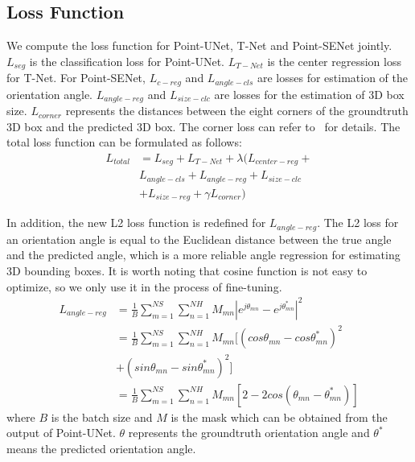 \documentclass[letterpaper]{article}
\begin{document}
\subsection{Loss Function}
We compute the loss function for Point-UNet, T-Net and Point-SENet jointly.
$L_{seg}$ is the classification loss for Point-UNet. $L_{T-Net}$ is
the center regression loss for T-Net. For Point-SENet, $L_{c-reg}$ and $L_{angle-cls}$ are losses for estimation of the orientation angle. $L_{angle-reg}$ and $L_{size-clc}$ are losses for the estimation of 3D box size. $L_{corner}$ represents the distances between the eight corners of the groundtruth 3D box and the predicted 3D box. The corner loss can refer to~\cite{qi2017frustum} for details. The total loss function can be formulated as follows:
\begin{equation}
\begin{aligned}
 L_{total} & =  L_{seg} + L_{T-Net} + \lambda (L_{center-reg}+ \\
 & L_{angle-cls}+ L_{angle-reg}+L_{size-clc} \\
  & +L_{size-reg} + \gamma L_{corner})
\end{aligned}
\end{equation}

In addition, the new L2 loss function is redefined for $L_{angle-reg}$. The L2 loss for an orientation angle is equal to the Euclidean distance between the true angle and the predicted angle, which is a more reliable angle regression for estimating 3D bounding boxes. It is worth noting that cosine function is not easy to optimize, so we only use it in the process of fine-tuning.
\begin{equation}
\begin{aligned}
L_{angle-reg} & = \frac{1}{B} \sum_{m=1}^{NS} \sum_{n=1}^{NH} {M}_{mn} |e^{j                  \theta_{mn}}-e^{j\theta_{mn}^*}|^2  \\
              & = \frac{1}{B} \sum_{m=1}^{NS} \sum_{n=1}^{NH} {M}_{mn}
              [(cos\theta_{mn}-cos{\theta_{mn}^*})^2 \\
              &+ (sin\theta_{mn}-sin{\theta_{mn}^*})^2 ]\\
              & = \frac{1}{B} \sum_{m=1}^{NS} \sum_{n=1}^{NH} {M}_{mn}[2-2cos(\theta_{mn}-\theta_{mn}^*)]
\end{aligned}
\end{equation}
 where $B$ is the batch size and $M$ is the mask which can be obtained from the output of Point-UNet. $\theta$ represents the groundtruth orientation angle and ${\theta^*}$ means the predicted orientation angle.
\end{document}
